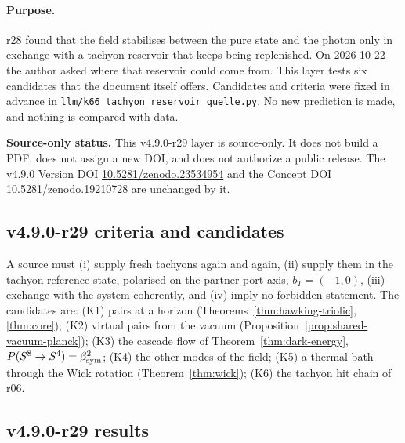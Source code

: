\paragraph{Purpose.}
r28 found that the field stabilises between the pure state and the photon only in exchange with a tachyon reservoir that keeps
being replenished.  On 2026-10-22 the author asked where that reservoir could come from.  This layer tests six candidates that the
document itself offers.  Candidates and criteria were fixed in advance in \texttt{llm/k66\_tachyon\_reservoir\_quelle.py}.  No new
prediction is made, and nothing is compared with data.

\noindent\textbf{Source-only status.}
This v4.9.0-r29 layer is source-only.  It does not build a PDF, does not assign a new DOI,
and does not authorize a public release.  The v4.9.0 Version DOI
\href{https://doi.org/10.5281/zenodo.23534954}{10.5281/zenodo.23534954} and the Concept DOI
\href{https://doi.org/10.5281/zenodo.19210728}{10.5281/zenodo.19210728} are unchanged by it.

\subsection*{v4.9.0-r29 criteria and candidates}
\label{subsec:v490-r29-criteria}

A source must (i) supply fresh tachyons again and again, (ii) supply them in the tachyon reference state, polarised on the
partner-port axis, \(b_T=(-1,0)\), (iii) exchange with the system coherently, and (iv) imply no forbidden statement.  The candidates
are: (K1) pairs at a horizon (Theorems~\ref{thm:hawking-triolic}, \ref{thm:core}); (K2) virtual pairs from the vacuum
(Proposition~\ref{prop:shared-vacuum-planck}); (K3) the cascade flow of Theorem~\ref{thm:dark-energy}, \(P(S^8\to S^4)=\beta_{\mathrm{sym}}^2\);
(K4) the other modes of the field; (K5) a thermal bath through the Wick rotation (Theorem~\ref{thm:wick}); (K6) the tachyon hit
chain of r06.

\subsection*{v4.9.0-r29 results}
\label{subsec:v490-r29-results}

